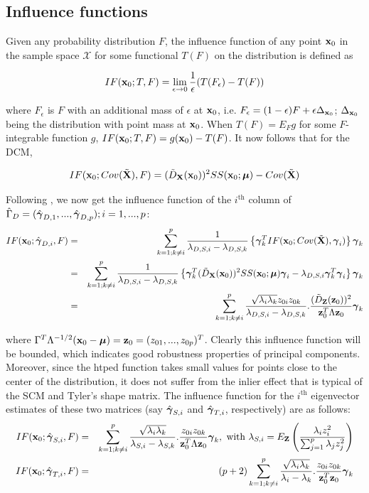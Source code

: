\documentclass[fleqn,12pt]{article}
\begin{document}
\subsection{Influence functions}
Given any probability distribution $F$, the influence function of any point ${\bf{x}}_0$ in the sample space $\mathcal{X}$ for some functional $T(F)$ on the distribution is defined as

$$ IF({\bf{x}}_0; T,F) = \lim_{\epsilon \rightarrow 0} \frac{1}{\epsilon} (T(F_\epsilon) - T(F)) $$

where $F_\epsilon$ is $F$ with an additional mass of $\epsilon$ at ${\bf{x}}_0$, i.e. $F_\epsilon = (1-\epsilon)F + \epsilon \Delta_{{\bf{x}}_0}$; $\Delta_{{\bf{x}}_0}$ being the distribution with point mass at ${\bf{x}}_0$. When $T(F) = E_F g$ for some $F$-integrable function $g$, $IF({\bf{x}}_0; T,F) = g({\bf{x}}_0) - T(F)$. It now follows that for the DCM,

$$ IF({\bf{x}}_0; Cov(\tilde {{\mathbf{X}}}), F) = (\tilde D_{\mathbf{X}}({\bf{x}}_0))^2 SS({\bf{x}}_0; {\boldsymbol{\mu}}) - Cov(\tilde {{\mathbf{X}}}) $$

Following \cite{croux00}, we now get the influence function of the $i^\text{th}$ column of $\hat\Gamma_D = (\hat{{\boldsymbol{\gamma}}}_{D,1},...,\hat{{\boldsymbol{\gamma}}}_{D,p}); i = 1,...,p$:
\begin{eqnarray}
IF({\bf{x}}_0; \hat{{\boldsymbol{\gamma}}}_{D,i}, F) &=& \sum_{k=1; k \neq i}^p \frac{1}{\lambda_{D,S,i} - \lambda_{D,S,k}} \left\{ {\boldsymbol{\gamma}}^T_k IF({\bf{x}}_0; Cov(\tilde {{\mathbf{X}}}), {\boldsymbol{\gamma}}_i) \right\} {\boldsymbol{\gamma}}_k \notag \\
&=& \sum_{k=1; k \neq i}^p \frac{1}{\lambda_{D,S,i} - \lambda_{D,S,k}} \left\{ {\boldsymbol{\gamma}}^T_k (\tilde D_{\mathbf{X}}({\bf{x}}_0))^2 SS({\bf{x}}_0; {\boldsymbol{\mu}}){\boldsymbol{\gamma}}_i - \lambda_{D,S,i}{\boldsymbol{\gamma}}_k^T{\boldsymbol{\gamma}}_i \right\} {\boldsymbol{\gamma}}_k \notag \\
&=& \sum_{k=1; k \neq i}^p \frac{\sqrt{\lambda_i \lambda_k} z_{0i} z_{0k}}{\lambda_{D,S,i} - \lambda_{D,S,k}}. \frac{(\tilde D_{\mathbf{Z}}({\bf{z}}_0))^2 }{{\bf{z}}_0^T \Lambda {\bf{z}}_0} {\boldsymbol{\gamma}}_k
\end{eqnarray}

where $\Gamma^T \Lambda^{-1/2} ({\bf{x}}_0 - {\boldsymbol{\mu}}) = {\bf{z}}_0 = (z_{01},...,z_{0p})^T$. Clearly this influence function will be bounded, which indicates good robustness properties of principal components. Moreover, since the htped function takes small values for points close to the center of the distribution, it does not suffer from the inlier effect that is typical of the SCM and Tyler's shape matrix. The influence function for the $i^\text{th}$ eigenvector estimates of these two matrices (say $\hat{{\boldsymbol{\gamma}}}_{S,i}$ and $\hat{{\boldsymbol{\gamma}}}_{T,i}$, respectively) are as follows:
\begin{eqnarray*}
\quad IF({\bf{x}}_0; \hat {{\boldsymbol{\gamma}}}_{S,i}, F) &=& \sum_{k=1; k \neq i}^p \frac{\sqrt{\lambda_i \lambda_k}}{\lambda_{S,i} - \lambda_{S,k}}. \frac{z_{0i} z_{0k}}{{\bf{z}}_0^T \Lambda {\bf{z}}_0} {\boldsymbol{\gamma}}_k, \text{ with } \lambda_{S,i} = E_{\mathbf{Z}} \left( \frac{\lambda_i z_i^2}{\sum_{j=1}^p \lambda_j z_j^2} \right) \quad \\
IF({\bf{x}}_0; \hat {{\boldsymbol{\gamma}}}_{T,i}, F) &=& (p+2) \sum_{k=1; k \neq i}^p \frac{\sqrt{\lambda_i \lambda_k}}{\lambda_i - \lambda_k}. \frac{z_{0i} z_{0k}}{{\bf{z}}_0^T {\bf{z}}_0} {\boldsymbol{\gamma}}_k \quad 
\end{eqnarray*}
\end{document}
